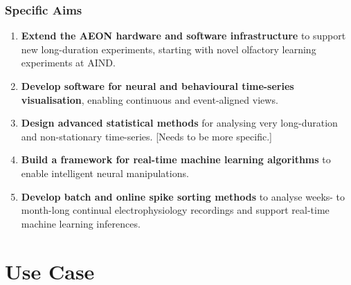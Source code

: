 \documentclass{beamer}
\begin{document}
\begin{frame}
    \frametitle{Specific Aims}

    \begin{enumerate}

        \item \textbf{Extend the AEON hardware and software infrastructure} to
            support new long-duration experiments, starting with novel
            olfactory learning experiments at AIND.

        \item \textbf{Develop software for neural and behavioural time-series
            visualisation}, enabling continuous and event-aligned views.

        \item \textbf{Design advanced statistical methods} for analysing very
            long-duration and non-stationary time-series. [Needs to be more specific.]

        \item \textbf{Build a framework for real-time machine learning algorithms} to
            enable intelligent neural manipulations. 

        \item \textbf{Develop batch and online spike sorting methods} to
            analyse weeks- to month-long continual electrophysiology recordings
            and support real-time machine learning inferences.

    \end{enumerate}

\end{frame}

\section{Use Case}
\end{document}
